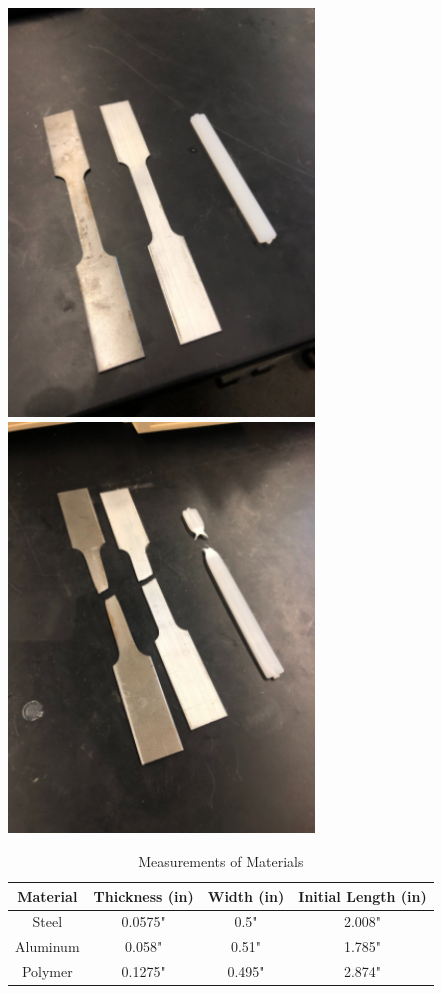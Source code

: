 \documentclass{article}
\begin{document}
\begin{center}
\includegraphics[width=230pt]{TensileTestBefore.png}
\includegraphics[width=230pt]{TensileTestAfter.png}
\end{center}

\vspace{.5cm}

\renewcommand{\arraystretch}{1.2}
\begin{table}[H]
\begin{center}
\begin{tabular}{c|c|c|c}
Material & Thickness (in) & Width (in) & Initial Length (in)\\
\hline
Steel & 0.0575" & 0.5" & 2.008"\\
\hline
Aluminum & 0.058" & 0.51" & 1.785"\\
\hline
Polymer & 0.1275" & 0.495" & 2.874"\\
\end{tabular}
\caption{Measurements of Materials}
\end{center}
\end{table}
\end{document}
